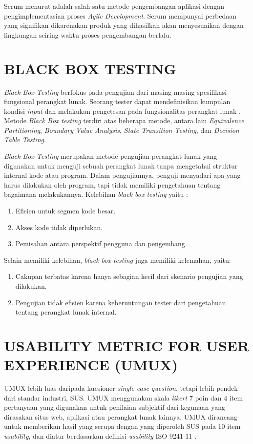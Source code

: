 \par Scrum menurut \citep{wahyudi2018analisis} adalah salah satu metode pengembangan aplikasi dengan pengimplementasian proses \textit{Agile Development}. Scrum mempunyai perbedaan yang signifikan dikarenakan produk yang dihasilkan akan menyesuaikan dengan lingkungan seiring waktu proses pengembangan berlalu.

\section{\uppercase{Black Box Testing}}
\textit{Black Box Testing} berfokus pada pengujian dari masing-masing spesifikasi fungsional perangkat lunak. Seorang tester dapat mendefinisikan kumpulan kondisi \textit{input} dan melakukan pengetesan pada fungsionalitas perangkat lunak \citep{mustaqbal2015pengujian}. Metode \textit{Black Box testing} terdiri atas beberapa metode, antara lain \textit{Equivalence Partitioning}, \textit{Boundary Value Analysis}, \textit{State Transition Testing}, dan \textit{Decision Table Testing}.

\par \textit{Black Box Testing} merupakan metode pengujian perangkat lunak yang digunakan untuk menguji sebuah perangkat lunak tanpa 
mengetahui struktur internal kode atau program. Dalam pengujiannya, penguji menyadari apa yang harus dilakukan oleh program, tapi tidak memiliki pengetahuan tentang bagaimana melakukannya. Kelebihan \textit{black box testing} yaitu :

\begin{enumerate}
	\item Efisien untuk segmen kode besar.
	\item Akses kode tidak diperlukan.
	\item Pemisahan antara perspektif pengguna dan pengembang.
\end{enumerate}

\par Selain memiliki kelebihan, \textit{black box testing} juga memiliki kelemahan, yaitu:

\begin{enumerate}
	\item Cakupan terbatas karena hanya sebagian kecil dari skenario pengujian yang dilakukan. 
	\item Pengujian tidak efisien karena keberuntungan tester dari pengetahuan tentang perangkat lunak internal.
\end{enumerate}

\section{\uppercase{Usability Metric for User Experience (UMUX)}}
UMUX lebih luas daripada kuesioner \textit{single ease question}, tetapi lebih pendek dari standar industri, SUS. UMUX menggunakan skala \textit{likert} 7 poin dan 4 item pertanyaan yang digunakan untuk penilaian subjektif dari kegunaan yang dirasakan situs web, aplikasi atau perangkat lunak lainnya. UMUX dirancang untuk memberikan hasil yang serupa dengan yang diperoleh SUS pada 10 item \textit{usability}, dan diatur berdasarkan definisi \textit{usability} ISO 9241-11 \citep{wahyuningrum2021buku}.

